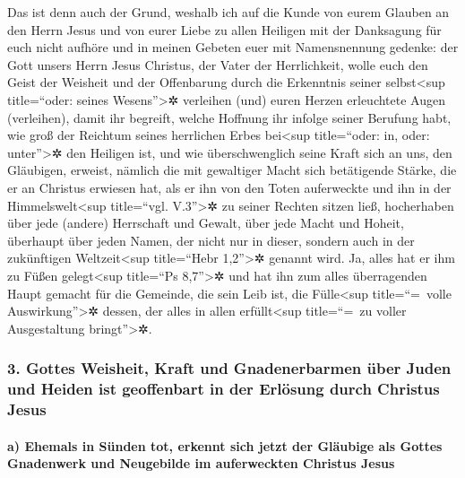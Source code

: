  Das ist denn auch der Grund, weshalb ich auf die Kunde
von eurem Glauben an den Herrn Jesus und von eurer Liebe zu allen
Heiligen  mit der Danksagung für euch nicht aufhöre und
in meinen Gebeten euer mit Namensnennung gedenke:  der
Gott unsers Herrn Jesus Christus, der Vater der Herrlichkeit, wolle euch
den Geist der Weisheit und der Offenbarung durch die Erkenntnis seiner
selbst\textless sup title=``oder: seines Wesens''\textgreater✲ verleihen
 (und) euren Herzen erleuchtete Augen (verleihen), damit
ihr begreift, welche Hoffnung ihr infolge seiner Berufung habt, wie groß
der Reichtum seines herrlichen Erbes bei\textless sup title=``oder: in,
oder: unter''\textgreater✲ den Heiligen ist,  und wie
überschwenglich seine Kraft sich an uns, den Gläubigen, erweist, nämlich
die mit gewaltiger Macht sich betätigende Stärke,  die er
an Christus erwiesen hat, als er ihn von den Toten auferweckte und ihn
in der Himmelswelt\textless sup title=``vgl. V.3''\textgreater✲ zu
seiner Rechten sitzen ließ,  hocherhaben über jede
(andere) Herrschaft und Gewalt, über jede Macht und Hoheit, überhaupt
über jeden Namen, der nicht nur in dieser, sondern auch in der
zukünftigen Weltzeit\textless sup title=``Hebr 1,2''\textgreater✲
genannt wird.  Ja, alles hat er ihm zu Füßen
gelegt\textless sup title=``Ps 8,7''\textgreater✲ und hat ihn zum alles
überragenden Haupt gemacht für die Gemeinde,  die sein
Leib ist, die Fülle\textless sup title=``=~volle
Auswirkung''\textgreater✲ dessen, der alles in allen
erfüllt\textless sup title=``=~zu voller Ausgestaltung
bringt''\textgreater✲.

\hypertarget{gottes-weisheit-kraft-und-gnadenerbarmen-uxfcber-juden-und-heiden-ist-geoffenbart-in-der-erluxf6sung-durch-christus-jesus}{%
\subsubsection{3. Gottes Weisheit, Kraft und Gnadenerbarmen über Juden
und Heiden ist geoffenbart in der Erlösung durch Christus
Jesus}\label{gottes-weisheit-kraft-und-gnadenerbarmen-uxfcber-juden-und-heiden-ist-geoffenbart-in-der-erluxf6sung-durch-christus-jesus}}

\hypertarget{a-ehemals-in-suxfcnden-tot-erkennt-sich-jetzt-der-gluxe4ubige-als-gottes-gnadenwerk-und-neugebilde-im-auferweckten-christus-jesus}{%
\paragraph{a) Ehemals in Sünden tot, erkennt sich jetzt der Gläubige als
Gottes Gnadenwerk und Neugebilde im auferweckten Christus
Jesus}\label{a-ehemals-in-suxfcnden-tot-erkennt-sich-jetzt-der-gluxe4ubige-als-gottes-gnadenwerk-und-neugebilde-im-auferweckten-christus-jesus}}

